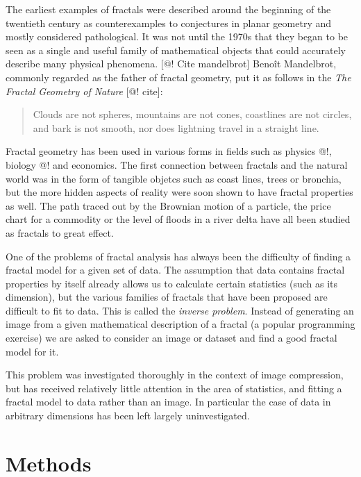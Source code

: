 \documentclass[11pt]{article}
\theoremstyle{definition}
\begin{document}
The earliest examples of fractals were described around the beginning of the twentieth century as counterexamples to conjectures in planar geometry and mostly considered pathological. It was not until the 1970s that they began to be seen as a single and useful family of mathematical objects that could accurately describe many physical phenomena. [@! Cite mandelbrot] Beno\^it Mandelbrot, commonly regarded as the father of fractal geometry, put it as follows in the \emph{The Fractal Geometry of Nature} [@! cite]:

\begin{quotation}
\small
\noindent Clouds are not spheres, mountains are not cones, coastlines are not circles, and bark is not smooth, nor does lightning travel in a straight line.
\end{quotation}

Fractal geometry has been used in various forms in fields such as physics @!, biology @! and economics. The first connection between fractals and the natural world was in the form of tangible objetcs such as coast lines, trees or bronchia, but the more hidden aspects of reality were soon shown to have fractal properties as well. The path traced out by the Brownian motion of a particle, the price chart for a commodity or the level of floods in a river delta have all been studied as fractals to great effect.

One of the problems of fractal analysis has always been the difficulty of finding a fractal model for a given set of data. The assumption that data contains fractal properties by itself already allows us to calculate certain statistics (such as its dimension), but the various families of fractals that have been proposed are difficult to fit to data. This is called the \emph{inverse problem}. Instead of generating an image from a given mathematical description of a fractal (a popular programming exercise) we are asked to consider an image or dataset and find a good fractal model for it.

This problem was investigated thoroughly in the context of image compression, but has received relatively little attention in the area of statistics, and fitting a fractal model to data rather than an image. In particular the case of data in arbitrary dimensions has been left largely uninvestigated.

\section{Methods}
\end{document}
